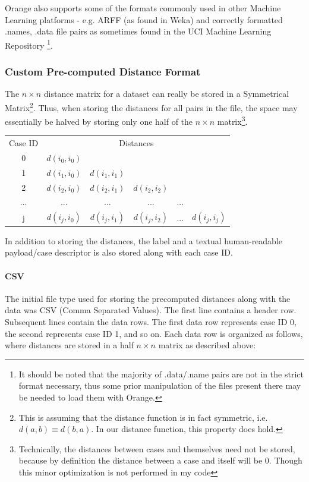 \documentclass[a4paper,11pt]{report}
\begin{document}
Orange also supports some of the formats commonly used in other Machine Learning platforms - e.g. ARFF (as found in Weka) and correctly formatted .names, .data file pairs as sometimes found in the UCI Machine Learning Repository \citep{web:uci}\footnote{It should be noted that the majority of .data/.name pairs are not in the strict format necessary, thus some prior manipulation of the files present there may be needed to load them with Orange.}.

\subsubsection{Custom Pre-computed Distance Format}

The $n \times n$ distance matrix for a dataset can really be stored in a Symmetrical Matrix\footnote{This is assuming that the distance function is in fact symmetric, i.e. $d(a, b)\equiv d(b, a)$. In our distance function, this property does hold.}. Thus, when storing the distances for all pairs in the file, the space may essentially be halved by storing only one half of the $n \times n$ matrix\footnote{Technically, the distances between cases and themselves need not be stored, because by definition the distance between a case and itself will be 0. Though this minor optimization is not performed in my code}.

\medskip

\begin{tabular}{ c c c c c c }
	Case ID & \multicolumn{5}{c}{Distances} \\
	0 & $d(i_{0},i_{0})$ &  &  &  & \\
	1 & $d(i_{1},i_{0})$ & $d(i_{1},i_{1})$ &  &  &  \\
	2 & $d(i_{2},i_{0})$ & $d(i_{2},i_{1})$ & $d(i_{2},i_{2})$ &  & \\ 
	... & ... & ... & ... & ... & \\ 
	j & $d(i_{j},i_{0})$ & $d(i_{j},i_{1})$ & $d(i_{j},i_{2})$ & ... & $d(i_{j},i_{j})$ \\ 
\end{tabular}

\medskip

In addition to storing the distances, the label and a textual human-readable payload/case descriptor is also stored along with each case ID.

\paragraph{CSV}
The initial file type used for storing the precomputed distances along with the data was CSV (Comma Separated Values). The first line contains a header row. Subsequent lines contain the data rows. The first data row represents case ID 0, the second represents case ID 1, and so on. Each data row is organized as follows, where distances are stored in a half $n \times n$ matrix as described above:
\medskip
\end{document}
